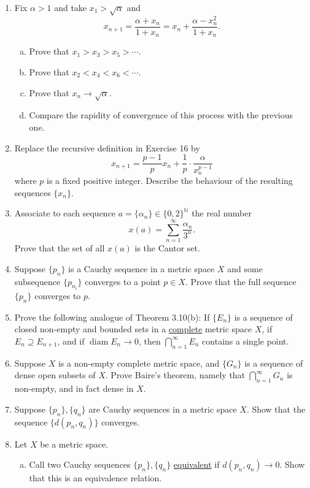 \documentclass{scrbook}
\newcommand{\N}{\mathbb{N}}
\renewcommand{\to}{\rightarrow}
\renewcommand{\underline}{\ul}
\DeclareMathOperator{\diam}{diam}
\begin{document}
\begin{enumerate}
\item %
Fix $\alpha > 1$ and take $x_1 > \sqrt{\alpha}$ and
\[
	x_{n+1} = \frac{\alpha + x_n}{1 + x_n} = x_n + \frac{\alpha - x_n^2}{1 + x_n}.
\]
\begin{enumerate}[(a)]
\item Prove that $x_1 > x_3 > x_5 > \dotsb$.
\item Prove that $x_2 < x_4 < x_6 < \dotsb$.
\item Prove that $x_n \to \sqrt{\alpha}$.
\item Compare the rapidity of convergence of this process with the previous one.
\end{enumerate}

\item %
Replace the recursive definition in Exercise 16 by
\[
	x_{n+1} = \frac{p-1}{p} x_n + \frac{1}{p} \cdot \frac{\alpha}{x_n^{p-1}}
\]
where $p$ is a fixed positive integer. Describe the behaviour of the resulting sequences $\{x_n\}$. 

\item %
Associate to each sequence $a = \{\alpha_n\} \in \{0, 2\}^{\N}$ the real number
\[
	x(a) = \sum_{n=1}^{\infty} \frac{\alpha_n}{3^n}.
\]
Prove that the set of all $x(a)$ is the Cantor set.

\item %
Suppose $\{p_n\}$ is a Cauchy sequence in a metric space $X$ and some subsequence $\{p_{n_i}\}$ converges to a point $p \in X$. Prove that the full sequence $\{p_n\}$ converges to $p$.

\item %
Prove the following analogue of Theorem 3.10(b): If $\{E_n\}$ is a sequence of closed non-empty and bounded sets in a \underline{complete} metric space $X$, if $E_n \supseteq E_{n+1}$, and if $\diam E_n \to 0$, then $\bigcap_{n=1}^{\infty} E_n$ contains a single point.

\item %
Suppose $X$ is a non-empty complete metric space, and $\{G_n\}$ is a sequence of dense open subsets of $X$. Prove Baire's theorem, namely that $\bigcap_{n=1}^{\infty} G_n$ is non-empty, and in fact dense in $X$.

\item %
Suppose $\{p_n\}, \{q_n\}$ are Cauchy sequences in a metric space $X$. Show that the sequence $\{d(p_n, q_n)\}$ converges.

\item %
Let $X$ be a metric space.
\begin{enumerate}[(a)]
\item Call two Cauchy sequences $\{p_n\}, \{q_n\}$ \underline{equivalent} if $d(p_n, q_n) \to 0$. Show that this is an equivalence relation.


\end{enumerate}
\end{enumerate}
\end{document}
